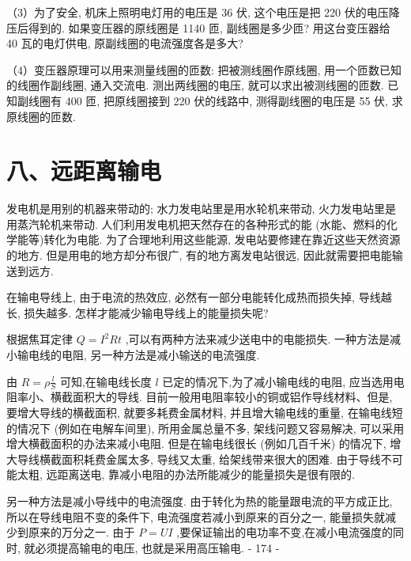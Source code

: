\documentclass[10pt]{article}
\begin{document}
（3）为了安全, 机床上照明电灯用的电压是 36 伏, 这个电压是把 220 伏的电压降压后得到的. 如果变压器的原线圈是 1140 匝, 副线圈是多少匝? 用这台变压器给 40 瓦的电灯供电, 原副线圈的电流强度各是多大?

（4）变压器原理可以用来测量线圈的匝数: 把被测线圈作原线圈, 用一个匝数已知的线圈作副线圈, 通入交流电. 测出两线圈的电压, 就可以求出被测线圈的匝数. 已知副线圈有 400 匝, 把原线圈接到 220 伏的线路中, 测得副线圈的电压是 55 伏, 求原线圈的匝数.

\section*{八、远距离输电}

发电机是用别的机器来带动的; 水力发电站里是用水轮机来带动, 火力发电站里是用蒸汽轮机来带动. 人们利用发电机把天然存在的各种形式的能 (水能、燃料的化学能等)转化为电能. 为了合理地利用这些能源, 发电站要修建在靠近这些天然资源的地方. 但是用电的地方却分布很广, 有的地方离发电站很远, 因此就需要把电能输送到远方.

在输电导线上, 由于电流的热效应, 必然有一部分电能转化成热而损失掉, 导线越长, 损失越多. 怎样才能减少输电导线上的能量损失呢?

根据焦耳定律 \(Q = {I}^{2}{Rt}\) ,可以有两种方法来减少送电中的电能损失. 一种方法是减小输电线的电阻, 另一种方法是减小输送的电流强度.

由 \(R = \rho \frac{l}{S}\) 可知,在输电线长度 \(l\) 已定的情况下,为了减小输电线的电阻, 应当选用电阻率小、横截面积大的导线. 目前一般用电阻率较小的铜或铝作导线材料、但是, 要增大导线的横截面积, 就要多耗费金属材料, 并且增大输电线的重量, 在输电线短的情况下 (例如在电解车间里), 所用金属总量不多, 架线问题又容易解决, 可以采用增大横截面积的办法来减小电阻. 但是在输电线很长 (例如几百千米) 的情况下, 增大导线横截面积耗费金属太多, 导线又太重, 给架线带来很大的困难. 由于导线不可能太粗, 远距离送电, 靠减小电阻的办法所能减少的能量损失是很有限的.

另一种方法是减小导线中的电流强度. 由于转化为热的能量跟电流的平方成正比, 所以在导线电阻不变的条件下, 电流强度若减小到原来的百分之一, 能量损失就减少到原来的万分之一. 由于 \(P = {UI}\) ,要保证输出的电功率不变,在减小电流强度的同时, 就必须提高输电的电压, 也就是采用高压输电. - 174 -
\end{document}
